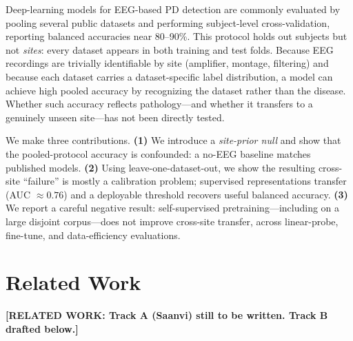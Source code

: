 \documentclass[runningheads]{llncs}
\begin{document}
Deep-learning models for EEG-based PD detection are commonly evaluated by pooling several public datasets and performing subject-level cross-validation, reporting balanced accuracies near 80--90\%. This protocol holds out subjects but not \emph{sites}: every dataset appears in both training and test folds. Because EEG recordings are trivially identifiable by site (amplifier, montage, filtering) and because each dataset carries a dataset-specific label distribution, a model can achieve high pooled accuracy by recognizing the dataset rather than the disease. Whether such accuracy reflects pathology---and whether it transfers to a genuinely unseen site---has not been directly tested.

We make three contributions. \textbf{(1)} We introduce a \emph{site-prior null} and show that the pooled-protocol accuracy is confounded: a no-EEG baseline matches published models. \textbf{(2)} Using leave-one-dataset-out, we show the resulting cross-site ``failure'' is mostly a calibration problem; supervised representations transfer (AUC $\approx 0.76$) and a deployable threshold recovers useful balanced accuracy. \textbf{(3)} We report a careful negative result: self-supervised pretraining---including on a large disjoint corpus---does not improve cross-site transfer, across linear-probe, fine-tune, and data-efficiency evaluations.

\section{Related Work}
\textbf{[RELATED WORK: Track A (Saanvi) still to be written. Track B drafted below.]}

\end{document}
